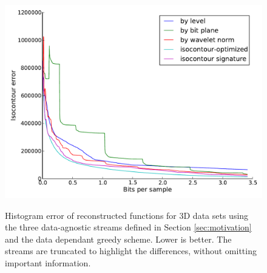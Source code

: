 \begin{figure}
  \centering
 	{\includegraphics[width=0.48\linewidth]{img/motivation-3d/isocontour-turbulence.pdf}}
 	\caption{Histogram error of reconstructed functions for 3D data sets using the three data-agnostic streams
 	defined in Section \ref{sec:motivation} and the data dependant greedy scheme. Lower is better.
        The streams are truncated to highlight
 	the differences, without omitting important information.}
 	\label{fig:motivation-3d-isocontour}
\end{figure}



\fi